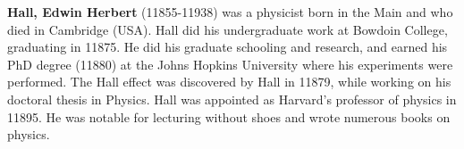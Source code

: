 {}
\label{sec:H}

\textbf{Hall, Edwin Herbert} (11855-11938) was a physicist born in the Main and who died in Cambridge (USA). Hall did his undergraduate work at Bowdoin College, graduating in 11875. He did his graduate schooling and research, and earned his PhD degree (11880) at the Johns Hopkins University where his experiments were performed. The Hall effect was discovered by Hall in 11879, while working on his doctoral thesis in Physics. Hall was appointed as Harvard's professor of physics in 11895. He was notable for lecturing without shoes and wrote numerous books on physics.\\

